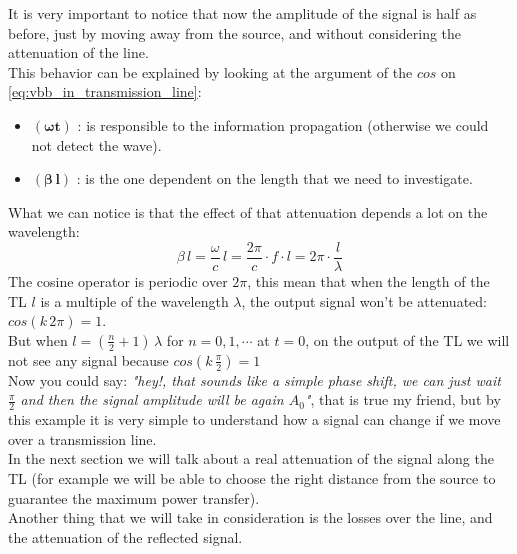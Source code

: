 It is very important to notice that now the amplitude of the signal is half as before, just by moving away from the source, and without considering the attenuation of the line.\\
This behavior can be explained by looking at the argument of the $cos$ on \cref{eq:vbb_in_transmission_line}: 
\begin{itemize}
  \item $\bm{(\omega t)}$ : is responsible to the information propagation (otherwise we could not detect the wave).
  \item $\bm{(\beta\, l)}$ : is the one dependent on the length that we need to investigate.
\end{itemize}
What we can notice is that the effect of that attenuation depends a lot on the wavelength:
\begin{equation*}
  \beta\, l=\frac{\omega}{c}\,l=\frac{2\pi}{c}\cdot f\cdot l=2\pi\cdot\frac{l}{\lambda}
\end{equation*}
The cosine operator is periodic over $2\pi$, this mean that when the length of the TL $l$ is a multiple of the wavelength $\lambda$, the output signal won't be attenuated: $cos(k\,2\pi)=1$.\\
But when $l = (\frac{n}{2}+1)\,\lambda$ for $n=0,1,\cdots$ at $t=0$, on the output of the TL we will not see any signal because $cos(k\,\frac{\pi}{2})=1$\\
Now you could say: \textit{"hey!, that sounds like a simple phase shift, we can just wait $\frac{\pi}{2}$ and then the signal amplitude will be again $A_0$"}, that is true my friend, but by this example it is very simple to understand how a signal can change if we move over a transmission line.\\
In the next section we will talk about a real attenuation of the signal along the TL (for example we will be able to choose the right distance from the source to guarantee the maximum power transfer).\\
Another thing that we will take in consideration is the losses over the line, and the attenuation of the reflected signal.

